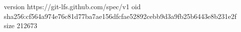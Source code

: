 version https://git-lfs.github.com/spec/v1
oid sha256:cf564a974e76c81d77ba7ae156dfcfae52892cebb9d3a9fb25b6443e8b231e2f
size 212673
